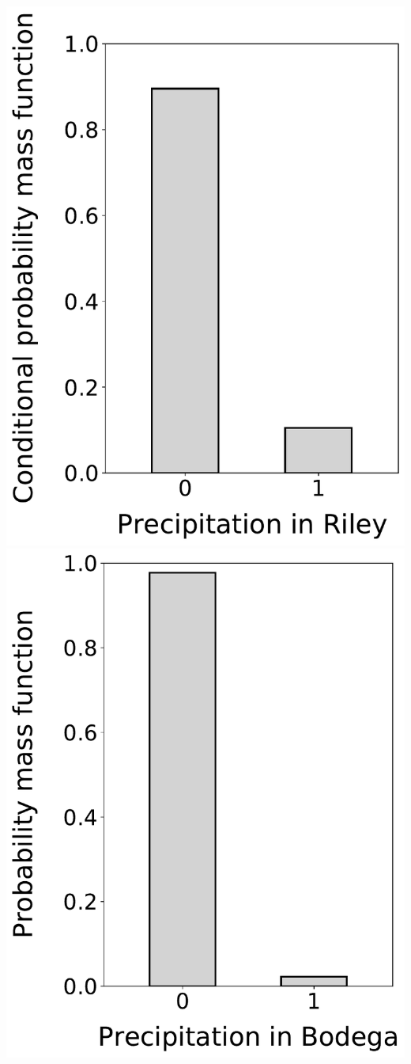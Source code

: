 \documentclass[12pt,twoside]{article}
\begin{document}
\begin{enumerate}
\includegraphics[scale=.5]{precipitation_cond_pmf_3_given_2eq1.pdf}
\includegraphics[scale=.5]{precipitation_marginal_pmf_1.pdf}

\end{enumerate}
\end{document}
